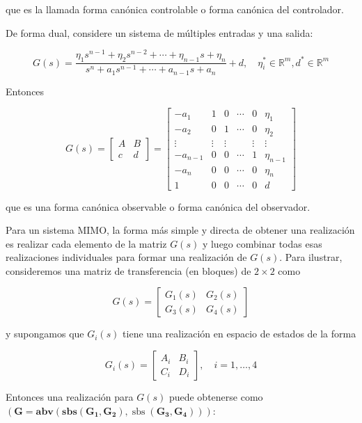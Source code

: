 \documentclass[11pt]{article}
\begin{document}
que es la llamada forma canónica controlable o forma canónica del controlador.

De forma dual, considere un sistema de múltiples entradas y una salida:

$$
G(s)=\frac{\eta_{1} s^{n-1}+\eta_{2} s^{n-2}+\cdots+\eta_{n-1} s+\eta_{n}}{s^{n}+a_{1} s^{n-1}+\cdots+a_{n-1} s+a_{n}}+d, \quad \eta_{i}^{*} \in \mathbb{R}^{m}, d^{*} \in \mathbb{R}^{m}
$$

Entonces

$$
G(s)=\left[\begin{array}{c|c}
A & B \\
\hline c & d
\end{array}\right]=\left[\begin{array}{ccccc|c}
-a_{1} & 1 & 0 & \cdots & 0 & \eta_{1} \\
-a_{2} & 0 & 1 & \cdots & 0 & \eta_{2} \\
\vdots & \vdots & \vdots & & \vdots & \vdots \\
-a_{n-1} & 0 & 0 & \cdots & 1 & \eta_{n-1} \\
-a_{n} & 0 & 0 & \cdots & 0 & \eta_{n} \\
\hline 1 & 0 & 0 & \cdots & 0 & d
\end{array}\right]
$$

que es una forma canónica observable o forma canónica del observador.

Para un sistema MIMO, la forma más simple y directa de obtener una realización es realizar cada elemento de la matriz $G(s)$ y luego combinar todas esas realizaciones individuales para formar una realización de $G(s)$. Para ilustrar, consideremos una matriz de transferencia (en bloques) de $2 \times 2$ como

$$
G(s)=\left[\begin{array}{ll}
G_{1}(s) & G_{2}(s) \\
G_{3}(s) & G_{4}(s)
\end{array}\right]
$$

y supongamos que $G_{i}(s)$ tiene una realización en espacio de estados de la forma

$$
G_{i}(s)=\left[\begin{array}{c|c}
A_{i} & B_{i} \\
\hline C_{i} & D_{i}
\end{array}\right], \quad i=1, \ldots, 4
$$

Entonces una realización para $G(s)$ puede obtenerse como $(\mathbf{G}=\mathbf{abv}(\mathbf{sbs}(\mathbf{G}_{\mathbf{1}}, \mathbf{G}_{\mathbf{2}}), \operatorname{sbs}(\mathbf{G}_{\mathbf{3}}, \mathbf{G}_{\mathbf{4}})))$:
\end{document}
